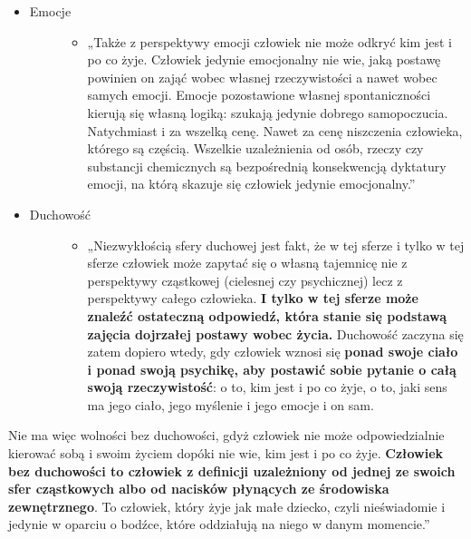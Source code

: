 \documentclass[a5paper,10pt,polish]{book}
\begin{document}
\begin{itemize}
\begin{description}
\end{description}

\item {} \begin{description}
\item[{Emocje}] \leavevmode\begin{itemize}
\item {} 
„Także z perspektywy emocji człowiek nie może odkryć kim jest i po co żyje. Człowiek jedynie emocjonalny nie wie, jaką postawę powinien on zająć wobec własnej rzeczywistości a nawet wobec samych emocji.  Emocje  pozostawione własnej  spontaniczności kierują się własną logiką: szukają jedynie dobrego samopoczucia. Natychmiast i za wszelką cenę. Nawet za cenę niszczenia człowieka, którego są częścią. Wszelkie uzależnienia od osób, rzeczy czy substancji chemicznych są bezpośrednią konsekwencją dyktatury emocji, na którą skazuje się człowiek jedynie emocjonalny.”

\end{itemize}

\end{description}

\item {} \begin{description}
\item[{Duchowość}] \leavevmode\begin{itemize}
\item {} 
„Niezwykłością sfery duchowej jest fakt, że w tej sferze i tylko w tej  sferze człowiek może zapytać się o własną tajemnicę nie z perspektywy cząstkowej (cielesnej czy psychicznej)  lecz z perspektywy całego człowieka. \textbf{I tylko w tej sferze może znaleźć ostateczną odpowiedź, która stanie się podstawą zajęcia dojrzałej  postawy wobec życia.} Duchowość zaczyna się zatem dopiero wtedy, gdy człowiek wznosi się \textbf{ponad swoje ciało i ponad swoją psychikę, aby  postawić sobie pytanie  o całą swoją  rzeczywistość}:  o to, kim jest  i po co żyje, o to, jaki sens ma jego ciało, jego myślenie i jego emocje i on sam.

\end{itemize}

\end{description}

\end{itemize}

Nie  ma więc wolności bez duchowości, gdyż człowiek nie może odpowiedzialnie kierować sobą i swoim życiem dopóki nie wie, kim jest i po co żyje. \textbf{Człowiek  bez duchowości to człowiek z definicji uzależniony od jednej ze swoich sfer cząstkowych albo od nacisków płynących ze środowiska zewnętrznego}. To człowiek, który żyje jak małe dziecko, czyli nieświadomie i jedynie w oparciu o bodźce, które oddziałują na niego w danym momencie.”
\end{document}
